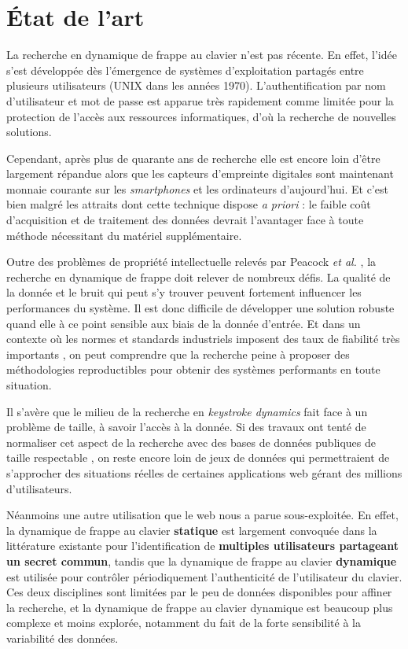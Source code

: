 \section{État de l'art}

La recherche en dynamique de frappe au clavier n'est pas récente\cite{wood1977}. En effet, l'idée s'est développée dès l'émergence de systèmes d'exploitation partagés entre plusieurs utilisateurs (UNIX dans les années 1970). L'authentification par nom d'utilisateur et mot de passe est apparue très rapidement comme limitée pour la protection de l'accès aux ressources informatiques, d'où la recherche de nouvelles solutions.

Cependant, après plus de quarante ans de recherche elle est encore loin d'être largement répandue alors que les capteurs d'empreinte digitales sont maintenant monnaie courante sur les \textit{smartphones} et les ordinateurs d'aujourd'hui. Et c'est bien malgré les attraits dont cette technique dispose \textit{a priori} : le faible coût d'acquisition et de traitement des données devrait l'avantager face à toute méthode nécessitant du matériel supplémentaire.

Outre des problèmes de propriété intellectuelle relevés par Peacock \textit{et al.} \cite{peacock2004}, la recherche en dynamique de frappe doit relever de nombreux défis. La qualité de la donnée et le bruit qui peut s'y trouver peuvent fortement influencer les performances du système. Il est donc difficile de développer une solution robuste quand elle à ce point sensible aux biais de la donnée d'entrée. Et dans un contexte où les normes et standards industriels imposent des taux de fiabilité très importants \cite{killourhy2009}, on peut comprendre que la recherche peine à proposer des méthodologies reproductibles pour obtenir des systèmes performants en toute situation.

Il s'avère que le milieu de la recherche en \textit{keystroke dynamics} fait face à un problème de taille, à savoir l'accès à la donnée. Si des travaux ont tenté de normaliser cet aspect de la recherche avec des bases de données publiques de taille respectable \cite{giotGREYC,killourhy2009}, on reste encore loin de jeux de données qui permettraient de s'approcher des situations réelles de certaines applications web gérant des millions d'utilisateurs.

Néanmoins une autre utilisation que le web nous a parue sous-exploitée. En effet, la dynamique de frappe au clavier \textbf{statique} est largement convoquée dans la littérature existante pour l'identification de \textbf{multiples utilisateurs partageant un secret commun}, tandis que la dynamique de frappe au clavier \textbf{dynamique} est utilisée pour contrôler périodiquement l'authenticité de l'utilisateur du clavier\cite{gunetti2005}. Ces deux disciplines sont limitées par le peu de données disponibles pour affiner la recherche, et la dynamique de frappe au clavier dynamique est beaucoup plus complexe et moins explorée, notamment du fait de la forte sensibilité à la variabilité des données.

